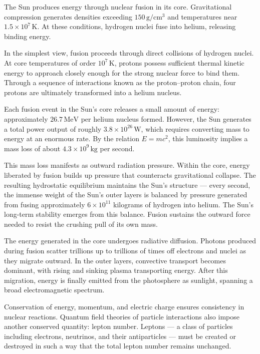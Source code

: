 The Sun produces energy through nuclear fusion in its core. Gravitational compression generates densities exceeding $150\,\text{g}/\text{cm}^3$ and temperatures near $1.5 \times 10^7\,\text{K}$. At these conditions, hydrogen nuclei fuse into helium, releasing binding energy.

In the simplest view, fusion proceeds through direct collisions of hydrogen nuclei. At core temperatures of order $10^7\,\text{K}$, protons possess sufficient thermal kinetic energy to approach closely enough for the strong nuclear force to bind them. Through a sequence of interactions known as the proton–proton chain, four protons are ultimately transformed into a helium nucleus. 

Each fusion event in the Sun's core releases a small amount of energy: approximately $26.7\,\text{MeV}$ per helium nucleus formed. However, the Sun generates a total power output of roughly $3.8 \times 10^{26}\,\text{W}$, which requires converting mass to energy at an enormous rate. By the relation $E = mc^2$, this luminosity implies a mass loss of about $4.3 \times 10^9\,\text{kg}$ per second.

This mass loss manifests as outward radiation pressure. Within the core, energy liberated by fusion builds up pressure that counteracts gravitational collapse. The resulting hydrostatic equilibrium maintains the Sun's structure — every second, the immense weight of the Sun's outer layers is balanced by pressure generated from fusing approximately $6 \times 10^{11}$ kilograms of hydrogen into helium. The Sun's long-term stability emerges from this balance. Fusion sustains the outward force needed to resist the crushing pull of its own mass.

The energy generated in the core undergoes radiative diffusion. Photons produced during fusion scatter trillions up to trillions of times off electrons and nuclei as they migrate outward. In the outer layers, convective transport becomes dominant, with rising and sinking plasma transporting energy. After this migration, energy is finally emitted from the photosphere as sunlight, spanning a broad electromagnetic spectrum.

Conservation of energy, momentum, and electric charge ensures consistency in nuclear reactions. Quantum field theories of particle interactions also impose another conserved quantity: lepton number. Leptons — a class of particles including electrons, neutrinos, and their antiparticles — must be created or destroyed in such a way that the total lepton number remains unchanged.

